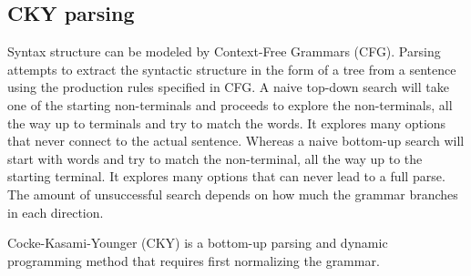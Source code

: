 \documentclass[a4paper, 11pt]{article}
\begin{document}





\subsection{CKY parsing}


Syntax structure can be modeled by Context-Free Grammars (CFG). Parsing attempts to extract the syntactic structure in the form of a tree from a sentence using the production rules specified in CFG.  A naive top-down search will take one of the starting non-terminals and proceeds to explore the non-terminals, all the way up to terminals and try to match the words. It explores many options that never connect to the actual sentence. Whereas a naive bottom-up search will start with words and try to match the non-terminal, all the way up to the starting terminal. It explores many options that can never lead to a full parse. The amount of unsuccessful search depends on how much the grammar branches in each direction.

Cocke-Kasami-Younger (CKY) \parencite{YOUNGER1967189} is a bottom-up parsing and dynamic programming method that requires first normalizing the grammar. 
\end{document}
